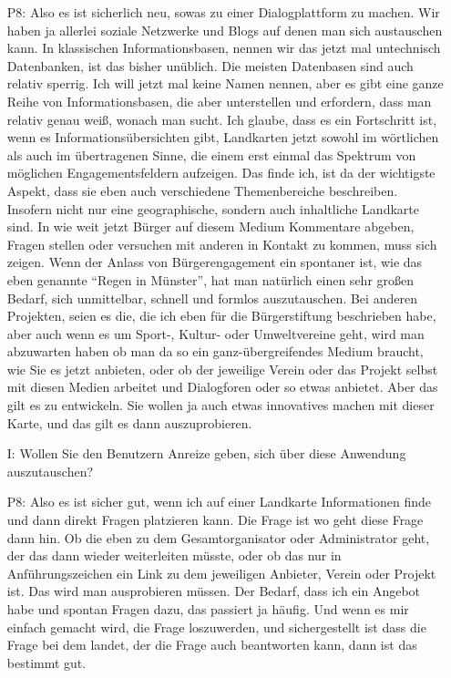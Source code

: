 \begin{itemize}
    \item[P8:] Also es ist sicherlich neu, sowas zu einer Dialogplattform zu machen. Wir haben ja allerlei soziale Netzwerke und Blogs auf denen man sich austauschen kann. In klassischen Informationsbasen, nennen wir das jetzt mal untechnisch Datenbanken, ist das bisher un{\"u}blich. Die meisten Datenbasen sind auch relativ sperrig. Ich will jetzt mal keine Namen nennen, aber es gibt eine ganze Reihe von Informationsbasen, die aber unterstellen und erfordern, dass man relativ genau wei{\ss}, wonach man sucht. Ich glaube, dass es ein Fortschritt ist, wenn es Informations{\"u}bersichten gibt, Landkarten jetzt sowohl im w{\"o}rtlichen als auch im {\"u}bertragenen Sinne, die einem erst einmal das Spektrum von m{\"o}glichen Engagementsfeldern aufzeigen. Das finde ich, ist da der wichtigste Aspekt, dass sie eben auch verschiedene Themenbereiche beschreiben. Insofern nicht nur eine geographische, sondern auch inhaltliche Landkarte sind. In wie weit jetzt B{\"u}rger auf diesem Medium Kommentare abgeben, Fragen stellen oder versuchen mit anderen in Kontakt zu kommen, muss sich zeigen. Wenn der Anlass von B{\"u}rgerengagement ein spontaner ist, wie das eben genannte "`Regen in M{\"u}nster"', hat man nat{\"u}rlich einen sehr gro{\ss}en Bedarf, sich unmittelbar, schnell und formlos auszutauschen. Bei anderen Projekten, seien es die, die ich eben f{\"u}r die B{\"u}rgerstiftung beschrieben habe, aber auch wenn es um Sport-, Kultur- oder Umweltvereine geht, wird man abzuwarten haben ob man da so ein ganz-{\"u}bergreifendes Medium braucht, wie Sie es jetzt anbieten, oder ob der jeweilige Verein oder das Projekt selbst mit diesen Medien arbeitet und Dialogforen oder so etwas anbietet. Aber das gilt es zu entwickeln. Sie wollen ja auch etwas innovatives machen mit dieser Karte, und das gilt es dann auszuprobieren.
    \item[I:] Wollen Sie den Benutzern Anreize geben, sich {\"u}ber diese Anwendung auszutauschen?
    \item[P8:] Also es ist sicher gut, wenn ich auf einer Landkarte Informationen finde und dann direkt Fragen platzieren kann. Die Frage ist wo geht diese Frage dann hin. Ob die eben zu dem Gesamtorganisator oder Administrator geht, der das dann wieder weiterleiten m{\"u}sste, oder ob das nur in Anf{\"u}hrungszeichen ein Link zu dem jeweiligen Anbieter, Verein oder Projekt ist. Das wird man ausprobieren m{\"u}ssen. Der Bedarf, dass ich ein Angebot habe und spontan Fragen dazu, das passiert ja h{\"a}ufig. Und wenn es mir einfach gemacht wird, die Frage loszuwerden, und sichergestellt ist dass die Frage bei dem landet, der die Frage auch beantworten kann, dann ist das bestimmt gut.

\end{itemize}
